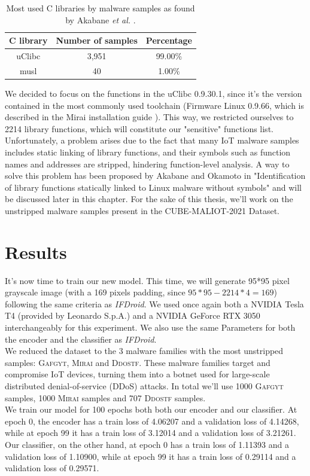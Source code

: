 \begin{table}[H]
    \centering
    \begin{tabular}{|c|c|c|}
    	\hline
        C library & Number of samples & Percentage \\
        \hline\hline
        uClibc & 3,951 & 99.00\% \\
        \hline
        musl & 40 & 1.00\% \\
        \hline
    \end{tabular}
    \caption{Most used C libraries by malware samples as found by Akabane \textit{et al.} \cite{akabane2021identification}.}
    \label{tab:CLibraries}
\end{table}

\noindent We decided to focus on the functions in the uClibc 0.9.30.1, since it's the version contained in the most commonly used toolchain (Firmware Linux 0.9.66, which is described in the Mirai installation guide  \cite{anna2016mirai}). This way, we restricted ourselves to 2214 library functions, which will constitute our "sensitive" functions list. \\
Unfortunately, a problem arises due to the fact that many IoT malware samples includes static linking of library functions, and their symbols such as function names and addresses are stripped, hindering function-level analysis. A way to solve this problem has been proposed by Akabane and Okamoto in "Identification of library functions statically linked to Linux malware without symbols" \cite{akabane2020identification} and will be discussed later in this chapter. For the sake of this thesis, we'll work on the unstripped malware samples present in the CUBE-MALIOT-2021 Dataset.

\section{Results}
It’s now time to train our new model. This time, we will generate 95*95 pixel grayscale image (with a 169 pixels padding, since $95*95-2214*4=169$) following the same criteria as \textit{IFDroid}. We used once again both a NVIDIA Tesla T4 (provided by Leonardo S.p.A.) and a NVIDIA GeForce RTX 3050 interchangeably for this experiment. We also use the same Parameters for both the encoder and the classifier as \textit{IFDroid}. \\
We reduced the dataset to the 3 malware families with the most unstripped samples: \textsc{Gafgyt}, \textsc{Mirai} and \textsc{Ddostf}. These malware families target and compromise IoT devices, turning them into a botnet used for large-scale distributed denial-of-service (DDoS) attacks. In total we'll use 1000 \textsc{Gafgyt} samples, 1000 \textsc{Mirai} samples and 707 \textsc{Ddostf} samples. \\
We train our model for 100 epochs both both our encoder and our classifier. At epoch 0, the encoder has a train loss of 4.06207 and a validation loss of 4.14268, while at epoch 99 it has a train loss of 3.12014 and a validation loss of 3.21261. Our classifier, on the other hand, at epoch 0 has a train loss of 1.11393 and a validation loss of 1.10900, while at epoch 99 it has a train loss of 0.29114 and a validation loss of 0.29571.

